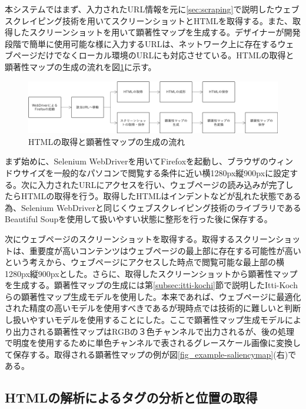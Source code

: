 \par 本システムではまず、入力されたURL情報を元に\ref{sec:scraping}で説明したウェブスクレイピング技術を用いてスクリーンショットとHTMLを取得する。また、取得したスクリーンショットを用いて顕著性マップを生成する。デザイナーが開発段階で簡単に使用可能な様に入力するURLは、ネットワーク上に存在するウェブページだけでなくローカル環境のURLにも対応させている。HTMLの取得と顕著性マップの生成の流れを図\ref{fig_system01}に示す。

\begin{figure}[H]
    \centering
    \includegraphics[width=12cm]{figures/system01.png}
    \caption{HTMLの取得と顕著性マップの生成の流れ}
    \label{fig_system01}
\end{figure}

\par まず始めに、Selenium WebDriverを用いてFirefoxを起動し、ブラウザのウィンドウサイズを一般的なパソコンで閲覧する条件に近い横1280px縦900pxに設定する。次に入力されたURLにアクセスを行い、ウェブページの読み込みが完了したらHTMLの取得を行う。取得したHTMLはインデントなどが乱れた状態である為、Selenium WebDriverと同じくウェブスクレイピング技術のライブラリであるBeautiful Soup\cite{beautifulsoup}を使用して扱いやすい状態に整形を行った後に保存する。

\par 次にウェブページのスクリーンショットを取得する。取得するスクリーンショットは、重要度が高いコンテンツはウェブページの最上部に存在する可能性が高いという考えから、ウェブページにアクセスした時点で閲覧可能な最上部の横1280px縦900pxとした。さらに、取得したスクリーンショットから顕著性マップを生成する。顕著性マップの生成には第\ref{subsec:itti-kochi}節で説明したItti-Kochらの顕著性マップ生成モデルを使用した。本来であれば、ウェブページに最適化された精度の高いモデルを使用すべきであるが現時点では技術的に難しいと判断し扱いやすいモデルを使用することにした。ここで顕著性マップ生成モデルにより出力される顕著性マップはRGBの３色チャンネルで出力されるが、後の処理で明度を使用するために単色チャンネルで表されるグレースケール画像に変換して保存する。取得される顕著性マップの例が図\ref{fig_example-saliencymap}(右)である。


\subsection{HTMLの解析によるタグの分析と位置の取得}\label{subsec:system02}

